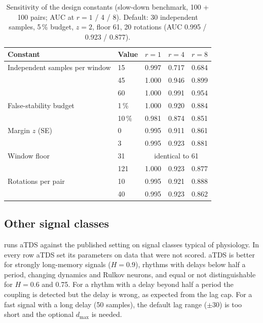 \documentclass[11pt,a4paper]{article}
\begin{document}
\begin{table}[t]
\centering
\caption{Sensitivity of the design constants (slow-down benchmark, 100 + 100 pairs; AUC at $r = 1$ / 4 / 8). Default: 30 independent samples, 5\,\% budget, $z = 2$, floor 61, 20 rotations (AUC 0.995 / 0.923 / 0.877).}
\label{tab:sensitivity}
\footnotesize
\begin{tabular}{llccc}
\toprule
Constant & Value & $r = 1$ & $r = 4$ & $r = 8$ \\
\midrule
Independent samples per window & 15 & 0.997 & 0.717 & 0.684 \\
 & 45 & 1.000 & 0.946 & 0.899 \\
 & 60 & 1.000 & 0.991 & 0.954 \\
False-stability budget & 1\,\% & 1.000 & 0.920 & 0.884 \\
 & 10\,\% & 0.981 & 0.874 & 0.851 \\
Margin $z$ (SE) & 0 & 0.995 & 0.911 & 0.861 \\
 & 3 & 0.995 & 0.923 & 0.881 \\
Window floor & 31 & \multicolumn{3}{c}{identical to 61} \\
 & 121 & 1.000 & 0.923 & 0.877 \\
Rotations per pair & 10 & 0.995 & 0.921 & 0.888 \\
 & 40 & 0.995 & 0.923 & 0.862 \\
\bottomrule
\end{tabular}
\end{table}

\subsection{Other signal classes}
 runs aTDS against the published setting on signal classes typical of physiology. In every row aTDS set its parameters on data that were not scored. aTDS is better for strongly long-memory signals ($H = 0.9$), rhythms with delays below half a period, changing dynamics and Rulkov neurons, and equal or not distinguishable for $H = 0.6$ and 0.75. For a rhythm with a delay beyond half a period the coupling is detected but the delay is wrong, as expected from the lag cap. For a fast signal with a long delay (50 samples), the default lag range ($\pm30$) is too short and the optional $d_{\max}$ is needed.
\end{document}
